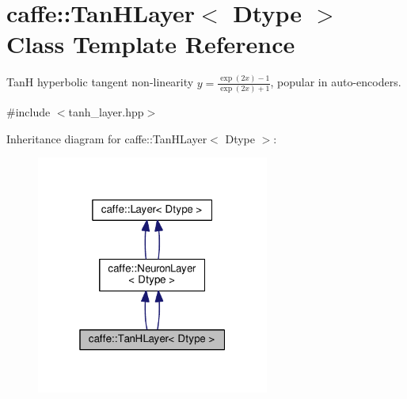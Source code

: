 \hypertarget{classcaffe_1_1_tan_h_layer}{}\section{caffe\+:\+:Tan\+H\+Layer$<$ Dtype $>$ Class Template Reference}
\label{classcaffe_1_1_tan_h_layer}


TanH hyperbolic tangent non-\/linearity $ y = \frac{\exp(2x) - 1}{\exp(2x) + 1} $, popular in auto-\/encoders.  




{\ttfamily \#include $<$tanh\+\_\+layer.\+hpp$>$}



Inheritance diagram for caffe\+:\+:Tan\+H\+Layer$<$ Dtype $>$\+:
\nopagebreak
\begin{figure}[H]
\begin{center}
\leavevmode
\includegraphics[width=217pt]{classcaffe_1_1_tan_h_layer__inherit__graph}
\end{center}
\end{figure}
